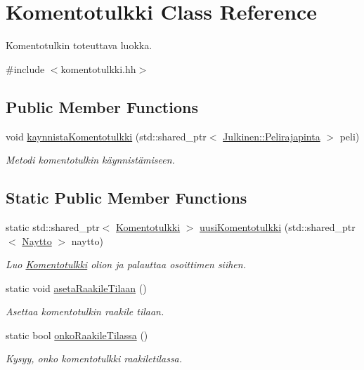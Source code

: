 \hypertarget{class_komentotulkki}{}\section{Komentotulkki Class Reference}
\label{class_komentotulkki}


Komentotulkin toteuttava luokka.  




{\ttfamily \#include $<$komentotulkki.\+hh$>$}

\subsection*{Public Member Functions}
\begin{DoxyCompactItemize}
\item 
void \hyperlink{class_komentotulkki_a3c9372e77cf9e4dbd741572f6445a106}{kaynnista\+Komentotulkki} (std\+::shared\+\_\+ptr$<$ \hyperlink{class_julkinen_1_1_pelirajapinta}{Julkinen\+::\+Pelirajapinta} $>$ peli)
\begin{DoxyCompactList}\small\item\em Metodi komentotulkin käynnistämiseen. \end{DoxyCompactList}\end{DoxyCompactItemize}
\subsection*{Static Public Member Functions}
\begin{DoxyCompactItemize}
\item 
static std\+::shared\+\_\+ptr$<$ \hyperlink{class_komentotulkki}{Komentotulkki} $>$ \hyperlink{class_komentotulkki_ad7a004ae7aac2fe0b28a21d84c9a0fb9}{uusi\+Komentotulkki} (std\+::shared\+\_\+ptr$<$ \hyperlink{class_naytto}{Naytto} $>$ naytto)
\begin{DoxyCompactList}\small\item\em Luo {\ttfamily \hyperlink{class_komentotulkki}{Komentotulkki}} olion ja palauttaa osoittimen siihen. \end{DoxyCompactList}\item 
static void \hyperlink{class_komentotulkki_ae87386f32d344bdb497a68da55a9a718}{aseta\+Raakile\+Tilaan} ()
\begin{DoxyCompactList}\small\item\em Asettaa komentotulkin raakile tilaan. \end{DoxyCompactList}\item 
\hypertarget{class_komentotulkki_a96d3141f3af61972998c5c6deb64c2ac}{}static bool \hyperlink{class_komentotulkki_a96d3141f3af61972998c5c6deb64c2ac}{onko\+Raakile\+Tilassa} ()\label{class_komentotulkki_a96d3141f3af61972998c5c6deb64c2ac}

\begin{DoxyCompactList}\small\item\em Kysyy, onko komentotulkki raakiletilassa. \end{DoxyCompactList}\end{DoxyCompactItemize}


